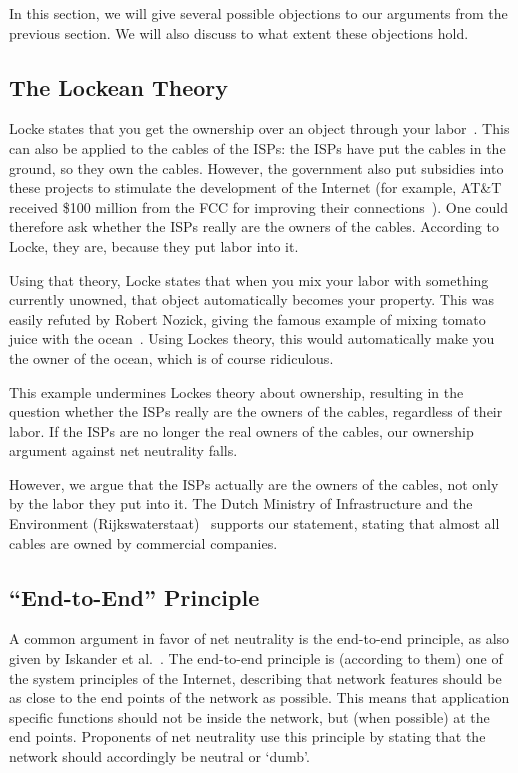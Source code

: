 
In this section, we will give several possible objections to our arguments from the previous section.
We will also discuss to what extent these objections hold.

\subsection{The Lockean Theory}
Locke states that you get the ownership over an object through your labor~\cite{tuckness2012locke}.
This can also be applied to the cables of the \acp{ISP}: the \acp{ISP} have put the cables in the ground, so they own the cables.
However, the government also put subsidies into these projects to stimulate the development of the Internet (for example, AT\&T received \$100 million from the FCC for improving their connections~\cite{bode2013att}).
One could therefore ask whether the \acp{ISP} really are the owners of the cables.
According to Locke, they are, because they put labor into it.

Using that theory, Locke states that when you mix your labor with something currently unowned, that object automatically becomes your property.
This was easily refuted by Robert Nozick, giving the famous example of mixing tomato juice with the ocean~\cite{tuckness2012locke}.
Using Lockes theory, this would automatically make you the owner of the ocean, which is of course ridiculous.

This example undermines Lockes theory about ownership, resulting in the question whether the \acp{ISP} really are the owners of the cables, regardless of their labor.
If the \acp{ISP} are no longer the real owners of the cables, our ownership argument against net neutrality falls.

However, we argue that the \acp{ISP} actually are the owners of the cables, not only by the labor they put into it.
The Dutch Ministry of Infrastructure and the Environment (Rijkswaterstaat)~\cite{rws2014kabels} supports our statement, stating that almost all cables are owned by commercial companies.

\subsection{``End-to-End'' Principle}
A common argument in favor of net neutrality is the end-to-end principle, as also given by Iskander et al.~\cite{iskander2010end}.
The end-to-end principle is (according to them) one of the system principles of the Internet, describing that network features should be as close to the end points of the network as possible.
This means that application specific functions should not be inside the network, but (when possible) at the end points.
Proponents of net neutrality use this principle by stating that the network should accordingly be neutral or `dumb'.

